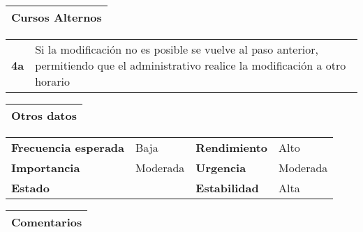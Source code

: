 \documentclass[11pt,a4paper]{article}
\begin{document}
\begin{table}[H]
	\begin{tabularx}{\textwidth}{X}
		\textbf{Cursos Alternos}\\ \hline
	\end{tabularx}
	\begin{tabularx}{\textwidth}{cX}
		\textbf{4a} & Si la modificación no es posible se vuelve al paso anterior, permitiendo que el administrativo realice la modificación a otro horario\\
	\end{tabularx}
\end{table}

\begin{table}[H]
	\begin{tabularx}{\textwidth}{X}
		\textbf{Otros datos}\\ \hline
	\end{tabularx}
	\begin{tabularx}{\textwidth}{lXlX}
		\textbf{Frecuencia esperada} & Baja & \textbf{Rendimiento} & Alto\\
		\textbf{Importancia} & Moderada & \textbf{Urgencia} & Moderada\\
		\textbf{Estado} &  & \textbf{Estabilidad} & Alta\\
	\end{tabularx}
	
	\begin{tabularx}{\textwidth}{X}
		\textbf{Comentarios}\\ \hline
	\end{tabularx}
\end{table}

\end{document}
